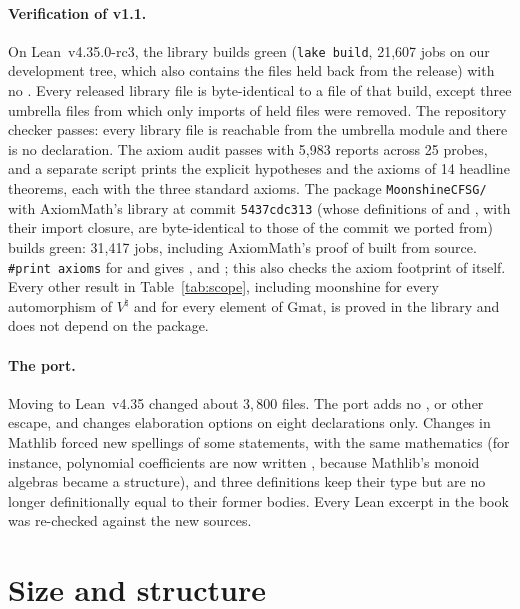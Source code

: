 \documentclass[10pt]{article}
\begin{document}
\paragraph{Verification of v1.1.} On Lean~v4.35.0-rc3, the library builds green (\texttt{lake build},
21{,}607 jobs on our development tree, which also contains the files held back from the release) with no
. Every released library file is byte-identical to a file of that build, except three umbrella files from
which only imports of held files were removed. The repository checker passes: every library
file is reachable from the umbrella module and there is no  declaration. The axiom audit passes with 5{,}983
reports across 25 probes, and a separate script prints the explicit hypotheses and the axioms of 14 headline theorems,
each with the three standard axioms. The package \texttt{MoonshineCFSG/} with AxiomMath's library at commit
\texttt{5437cdc313} (whose definitions of  and , with their import closure, are byte-identical to
those of the commit we ported from) builds green: 31{,}417 jobs, including AxiomMath's proof of 
built from source. \texttt{\#print axioms} for  and  gives
,  and ; this also checks the axiom footprint of
 itself. Every other result in Table~\ref{tab:scope}, including moonshine for every automorphism of
$V^\natural$ and for every element of $\mathrm{Gmat}$, is proved in the library and does not depend on the package.

\paragraph{The port.} Moving to Lean~v4.35 changed about $3{,}800$ files. The port adds no ,  or
other escape, and changes elaboration options on eight declarations only.
Changes in Mathlib forced new spellings of some statements, with the same mathematics (for instance, polynomial
coefficients are now written , because Mathlib's monoid algebras became a structure), and three
definitions keep their type but are no longer definitionally equal to their former bodies. Every Lean excerpt in the
book was re-checked against the new sources.

\section{Size and structure}
\end{document}
